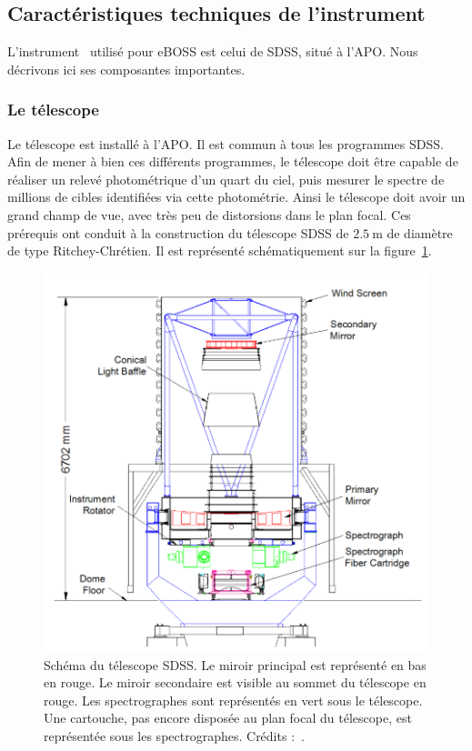 \subsection{Caractéristiques techniques de l'instrument}
L'instrument~\cite{Gunn2006} utilisé pour eBOSS est celui de SDSS, situé à l'APO. Nous décrivons ici ses composantes importantes.

\subsubsection{Le télescope}
Le télescope est installé à l'APO. Il est commun à tous les programmes SDSS. Afin de mener à bien ces différents programmes, le télescope doit être capable de réaliser un relevé photométrique d'un quart du ciel, puis mesurer le spectre de millions de cibles identifiées via cette photométrie. Ainsi le télescope doit avoir un grand champ de vue, avec très peu de distorsions dans le plan focal. Ces prérequis ont conduit à la construction du télescope SDSS de $\SI{2,5}{\meter}$ de diamètre de type Ritchey-Chrétien. Il est représenté schématiquement sur la figure~\ref{fig:SchemaTelescope}. \\
\begin{figure}
  \centering
  \includegraphics[scale=0.5]{SchemaTelescope}
  \caption{Schéma du télescope SDSS. Le miroir principal est représenté en bas en rouge. Le miroir secondaire est visible au sommet du télescope en rouge. Les spectrographes sont représentés en vert sous le télescope. Une cartouche, pas encore disposée au plan focal du télescope, est représentée sous les spectrographes. Crédits :~\cite{Smee2012}.}
  \label{fig:SchemaTelescope}
\end{figure}
